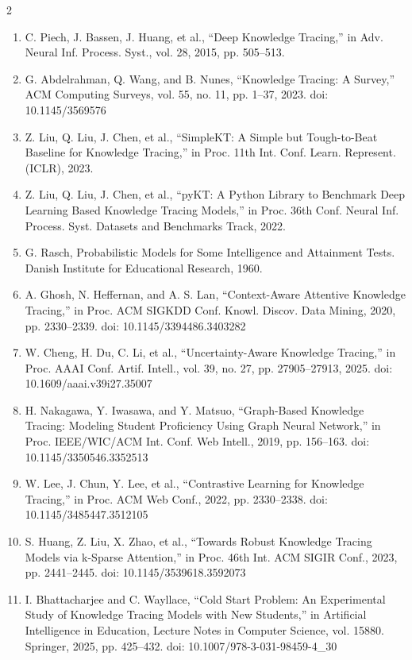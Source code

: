 \documentclass[10pt,a4paper]{article}
\begin{document}
\begin{multicols}{2}
{\begin{enumerate}
\item C. Piech, J. Bassen, J. Huang, et al., ``Deep Knowledge Tracing,'' in Adv. Neural Inf. Process. Syst., vol. 28, 2015, pp. 505--513.

\item G. Abdelrahman, Q. Wang, and B. Nunes, ``Knowledge Tracing: A Survey,'' ACM Computing Surveys, vol. 55, no. 11, pp. 1--37, 2023. doi: 10.1145/3569576

\item Z. Liu, Q. Liu, J. Chen, et al., ``SimpleKT: A Simple but Tough-to-Beat Baseline for Knowledge Tracing,'' in Proc. 11th Int. Conf. Learn. Represent. (ICLR), 2023.

\item Z. Liu, Q. Liu, J. Chen, et al., ``pyKT: A Python Library to Benchmark Deep Learning Based Knowledge Tracing Models,'' in Proc. 36th Conf. Neural Inf. Process. Syst. Datasets and Benchmarks Track, 2022.

\item G. Rasch, Probabilistic Models for Some Intelligence and Attainment Tests. Danish Institute for Educational Research, 1960.

\item A. Ghosh, N. Heffernan, and A. S. Lan, ``Context-Aware Attentive Knowledge Tracing,'' in Proc. ACM SIGKDD Conf. Knowl. Discov. Data Mining, 2020, pp. 2330--2339. doi: 10.1145/3394486.3403282

\item W. Cheng, H. Du, C. Li, et al., ``Uncertainty-Aware Knowledge Tracing,'' in Proc. AAAI Conf. Artif. Intell., vol. 39, no. 27, pp. 27905--27913, 2025. doi: 10.1609/aaai.v39i27.35007

\item H. Nakagawa, Y. Iwasawa, and Y. Matsuo, ``Graph-Based Knowledge Tracing: Modeling Student Proficiency Using Graph Neural Network,'' in Proc. IEEE/WIC/ACM Int. Conf. Web Intell., 2019, pp. 156--163. doi: 10.1145/3350546.3352513

\item W. Lee, J. Chun, Y. Lee, et al., ``Contrastive Learning for Knowledge Tracing,'' in Proc. ACM Web Conf., 2022, pp. 2330--2338. doi: 10.1145/3485447.3512105

\item S. Huang, Z. Liu, X. Zhao, et al., ``Towards Robust Knowledge Tracing Models via k-Sparse Attention,'' in Proc. 46th Int. ACM SIGIR Conf., 2023, pp. 2441--2445. doi: 10.1145/3539618.3592073

\item I. Bhattacharjee and C. Wayllace, ``Cold Start Problem: An Experimental Study of Knowledge Tracing Models with New Students,'' in Artificial Intelligence in Education, Lecture Notes in Computer Science, vol. 15880. Springer, 2025, pp. 425--432. doi: 10.1007/978-3-031-98459-4\_30


\end{enumerate}}
\end{multicols}
\end{document}

